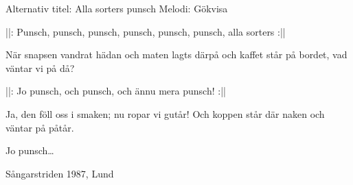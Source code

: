 \begin{song}

\begin{songmeta}
Alternativ titel: Alla sorters punsch
Melodi: Gökvisa
\end{songmeta}

\begin{songtext}
||: Punsch, punsch, punsch, punsch,
punsch, punsch, alla sorters :||

När snapsen vandrat hädan
och maten lagts därpå
och kaffet står på bordet,
vad väntar vi på då?

||: Jo punsch, och punsch,
och ännu mera punsch! :||

Ja, den föll oss i smaken;
nu ropar vi gutår!
Och koppen står där naken
och väntar på påtår.

Jo punsch\ldots
\end{songtext}

\begin{songnotes}
Sångarstriden 1987, Lund
\end{songnotes}
\end{song}
